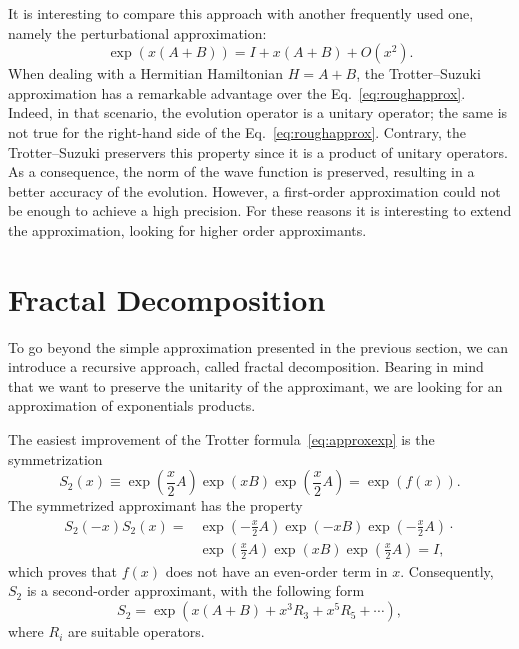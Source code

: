 It is interesting to compare this approach with another frequently used one, namely the perturbational approximation:
\begin{equation} \label{eq:roughapprox}
\exp\left({x(A+B)}\right) = I + x(A+B) + O(x^2).
\end{equation}
When dealing with a Hermitian Hamiltonian $H=A+B$, the Trotter--Suzuki approximation has a remarkable advantage over the Eq.~\eqref{eq:roughapprox}. Indeed, in that scenario, the evolution operator is a unitary operator; the same is not true for the right-hand side of the Eq.~\eqref{eq:roughapprox}. Contrary, the Trotter--Suzuki preservers this property since it is a product of unitary operators. As a consequence, the norm of the wave function is preserved, resulting in a better accuracy of the evolution. However, a first-order approximation could not be enough  to achieve a high precision. For these reasons it is interesting to extend the approximation, looking for higher order approximants.

\section{Fractal Decomposition}
To go beyond the simple approximation presented in the previous section, we can introduce a recursive approach, called fractal decomposition. Bearing in mind that we want to preserve the unitarity of the approximant, we are looking for an approximation of exponentials products.

The easiest improvement of the Trotter formula~\eqref{eq:approxexp} is the symmetrization
\begin{equation} 
S_2(x) \equiv \exp\left({\frac{x}{2}A}\right) \exp\left({xB}\right) \exp\left({\frac{x}{2}A}\right) = \exp\left({f(x)}\right).
\end{equation}
The symmetrized approximant has the property
\begin{align}
S_2(-x) S_2(x) = & \exp\left({-\frac{x}{2}A}\right) \exp\left({-xB}\right) \exp\left({-\frac{x}{2}A}\right) \cdot \nonumber \\ & \exp\left({\frac{x}{2}A}\right) \exp\left({xB}\right) \exp\left({\frac{x}{2}A}\right) = I, \nonumber
\end{align}
which proves that $f(x)$ does not have an even-order term in $x$. Consequently, $S_2$ is a second-order approximant, with the following form
\begin{equation} \label{eq:S2-form}
S_2 = \exp\left({x(A+B) + x^3R_3 + x^5R_5 + \cdots}\right),
\end{equation}
where $R_i$ are suitable operators.

